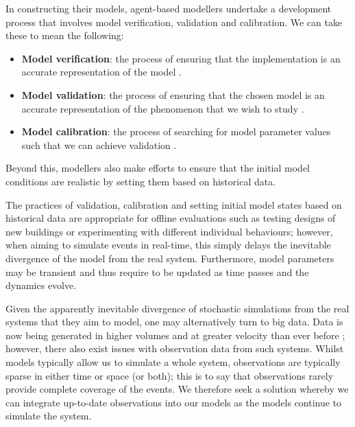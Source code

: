 In constructing their models, agent-based modellers undertake a development
process that involves model verification, validation and calibration.
We can take these to mean the following:
\begin{itemize}
    \item \textbf{Model verification}: the process of ensuring that the implementation is
        an accurate representation of the model \citep{xiang2005verification}.
    \item \textbf{Model validation}: the process of ensuring that the chosen model is an
        accurate representation of the phenomenon that we wish to study
        \citep{crooks2008key}.
    \item \textbf{Model calibration}: the process of searching for model parameter values
        such that we can achieve validation \citep{thiele2014facilitating}.
\end{itemize}
Beyond this, modellers also make efforts to ensure that the initial model
conditions are realistic by setting them based on historical data.

The practices of validation, calibration and setting initial model states based
on historical data are appropriate for offline evaluations such as testing designs
of new buildings or experimenting with different individual behaviours; however,
when aiming to simulate events in real-time, this simply delays the inevitable
divergence of the model from the real system.
Furthermore, model parameters may be transient and thus require to be updated as
time passes and the dynamics evolve.

Given the apparently inevitable divergence of stochastic simulations from the
real systems that they aim to model, one may alternatively turn to big data.
Data is now being generated in higher volumes and at greater velocity than ever
before \citep{chen2014big}; however, there also exist issues with observation
data from such systems.
Whilst models typically allow us to simulate a whole system, observations are
typically sparse in either time or space (or both); this is to say that
observations rarely provide complete coverage of the events.
We therefore seek a solution whereby we can integrate up-to-date observations
into our models as the models continue to simulate the system.

